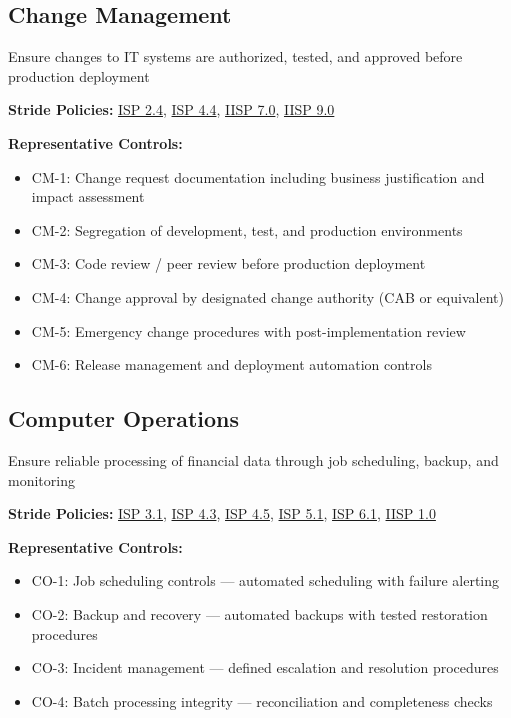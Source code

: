 \documentclass[11pt,landscape]{article}
\begin{document}
\subsection{Change Management}

Ensure changes to IT systems are authorized, tested, and approved before production deployment

\textbf{Stride Policies:} \hyperref[pol:ISP24]{ISP 2.4}, \hyperref[pol:ISP44]{ISP 4.4}, \hyperref[pol:IISP70]{IISP 7.0}, \hyperref[pol:IISP90]{IISP 9.0}

\textbf{Representative Controls:}
\begin{itemize}[leftmargin=*]
  \item CM-1: Change request documentation including business justification and impact assessment
  \item CM-2: Segregation of development, test, and production environments
  \item CM-3: Code review / peer review before production deployment
  \item CM-4: Change approval by designated change authority (CAB or equivalent)
  \item CM-5: Emergency change procedures with post-implementation review
  \item CM-6: Release management and deployment automation controls
\end{itemize}

\subsection{Computer Operations}

Ensure reliable processing of financial data through job scheduling, backup, and monitoring

\textbf{Stride Policies:} \hyperref[pol:ISP31]{ISP 3.1}, \hyperref[pol:ISP43]{ISP 4.3}, \hyperref[pol:ISP45]{ISP 4.5}, \hyperref[pol:ISP51]{ISP 5.1}, \hyperref[pol:ISP61]{ISP 6.1}, \hyperref[pol:IISP10]{IISP 1.0}

\textbf{Representative Controls:}
\begin{itemize}[leftmargin=*]
  \item CO-1: Job scheduling controls --- automated scheduling with failure alerting
  \item CO-2: Backup and recovery --- automated backups with tested restoration procedures
  \item CO-3: Incident management --- defined escalation and resolution procedures
  \item CO-4: Batch processing integrity --- reconciliation and completeness checks
\end{itemize}
\end{document}
